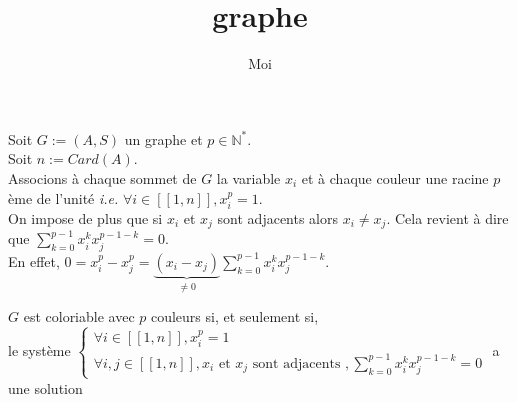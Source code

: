 \documentclass{article}
\title{graphe}
\author{Moi}
\begin{document}
\maketitle
Soit $G:=(A,S)$ un graphe et $p\in \mathbb{N}^*$. \\
Soit $n:=Card(A)$.\\
Associons à chaque sommet de $G$ la variable $x_i$ et à chaque couleur une racine $p$ème de l'unité \emph{i.e.} $\forall i \in [\![1,n]\!],x_i^p=1$. \\
On impose de plus que si $x_i$ et $x_j$ sont adjacents alors $x_i \neq x_j$.
Cela revient à dire que $\sum_{k=0}^{p-1} x_i^k x_j^{p-1-k}=0$. \\
En effet, $0=x_i^p-x_j^p=\underbrace{(x_i-x_j)}_{\neq 0}\sum_{k=0}^{p-1} x_i^k x_j^{p-1-k}$.

$G$ est coloriable avec $p$ couleurs si, et seulement si, \\
le système $\begin{cases} \forall i \in [\![1,n]\!],x_i^p=1 \\
\forall i,j \in [\![1,n]\!], x_i \text{ et } x_j \text{ sont adjacents }, \sum_{k=0}^{p-1} x_i^k x_j^{p-1-k}=0
\end{cases}$ a une solution
\end{document}
